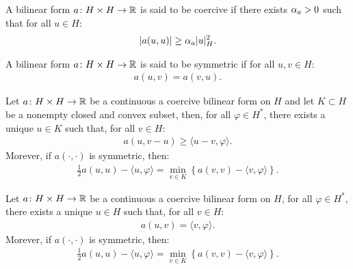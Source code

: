 \begin{definition}
    A bilinear form $a \colon H \times H \rightarrow \mathbb{R}$ is said to be coercive if there exists $\alpha_{a} > 0$ such that for all $u \in H$:
    \begin{gather}
        \lvert a(u, u) \rvert \geq \alpha_{a} \lvert u \rvert_H^2.
    \end{gather}
\end{definition}

\begin{definition}
    A bilinear form $a \colon H \times H \rightarrow \mathbb{R}$ is said to be symmetric if for all $u, v \in H$:
    \begin{gather}
        a(u, v) = a(v, u).
    \end{gather}
\end{definition}

\begin{theorem}[Stampacchia]
    Let $a \colon H \times H \rightarrow \mathbb{R}$ be a continuous a coercive bilinear form on $H$ and let $K \subset H$ be a nonempty closed and convex subset, then, for all $\varphi \in H^*$, there exists a unique $u \in K$ such that, for all $v \in H$:
    \begin{gather}
        a(u, v - u) \geq \langle u - v, \varphi \rangle.
    \end{gather}
    Morever, if $a(\cdot, \cdot)$ is symmetric, then:
    \begin{gather}
        \frac{1}{2} a(u, u) - \langle u, \varphi \rangle = \min_{v \in K} \left\{ a(v, v) - \langle v, \varphi \rangle \right\}.
    \end{gather}
\end{theorem}

\begin{corollary}
    Let $a \colon H \times H \rightarrow \mathbb{R}$ be a continuous a coercive bilinear form on $H$, for all $\varphi \in H^*$, there exists a unique $u \in H$ such that, for all $v \in H$:
    \begin{gather}
        a(u, v) = \langle v, \varphi \rangle.
    \end{gather}
    Morever, if $a(\cdot, \cdot)$ is symmetric, then:
    \begin{gather}
        \frac{1}{2} a(u, u) - \langle u, \varphi \rangle = \min_{v \in K} \left\{ a(v, v) - \langle v, \varphi \rangle \right\}.
    \end{gather}
\end{corollary}

